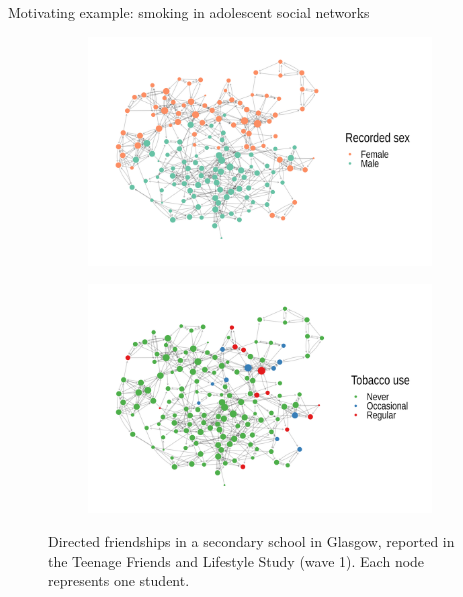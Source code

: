 \documentclass[final]{beamer}
\newlength{\colwidth}
\begin{document}
\begin{frame}[t]
\begin{columns}[t]
\begin{column}{\colwidth}
\begin{block}{Motivating example: smoking in adolescent social networks}
        \begin{figure}[ht!]
          \begin{subfigure}{0.49\textwidth}
            \centering
            \includegraphics[width=\textwidth]{figures/glasgow/sex.png}
          \end{subfigure}
          \begin{subfigure}{0.49\textwidth}
            \centering
            \includegraphics[width=\textwidth]{figures/glasgow/tobacco.png}
          \end{subfigure}
          \caption{Directed friendships in a secondary school in Glasgow, reported in the Teenage Friends and Lifestyle Study (wave 1). Each node represents one student.}
          \label{fig:glasgow}
        \end{figure}

      \end{block}



\end{column}
\end{columns}
\end{frame}
\end{document}
